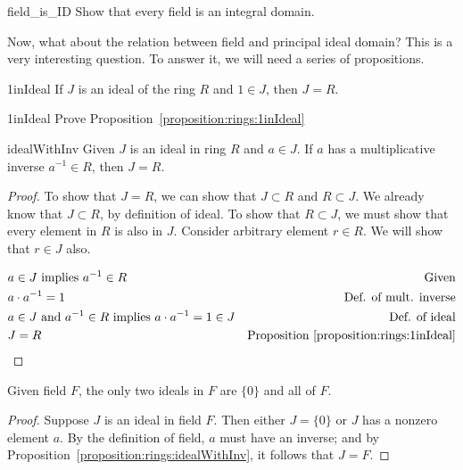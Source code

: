 \begin{exercise}{field_is_ID}
Show that every field is an integral domain. 
\end{exercise}

Now, what about the relation between field and principal ideal domain? This is  a very interesting question. To answer it, we will need a series of propositions.

\begin{prop}{1inIdeal}
If $J$ is an ideal of the ring $R$ and $1 \in J$, then $J = R$.
\end{prop}

\begin{exercise}{1inIdeal}
Prove Proposition~\ref{proposition:rings:1inIdeal}
\end{exercise}




\begin{prop}{idealWithInv}
Given $J$ is an ideal in ring $R$ and $a\in J$.  If $a$ has a multiplicative inverse $a^{-1}\in R$, then $J=R$.
\end{prop}

\begin{proof}{}
To show that $J=R$, we can show that $J\subset R$ and $R\subset J$.  We already know that $J\subset R$, by definition of ideal.  To show that $R\subset J$, we must show that every element in $R$ is also in $J$.  Consider arbitrary element $r\in R$. We will show that $r\in J$ also.

\begin{align*}
 &a\in J \text{ implies } a^{-1}\in R & \text{Given}\\
 &a\cdot a^{-1} = 1 & \text{Def. of mult. inverse}\\
 &a\in J \text{ and } a^{-1}\in R \text{ implies } a\cdot a^{-1}=1\in J & \text{Def. of ideal}\\
 &J = R  & \text{Proposition~\ref{proposition:rings:1inIdeal}}
\end{align*}

\end{proof}


\begin{prop}{}
Given field $F$, the only two ideals in $F$ are $\{0\}$ and all of $F$.

\begin{proof}
Suppose $J$ is an ideal in field $F$.  Then either $J=\{0\}$ or $J$ has a nonzero element $a$. By the definition of field, $a$ must have an inverse; and by Proposition~\ref{proposition:rings:idealWithInv}, it follows that $J=F$.
\end{proof}
\end{prop}

